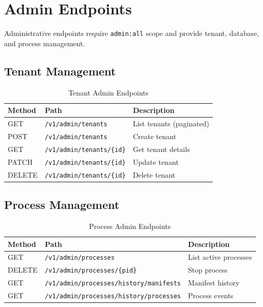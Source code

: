 \section{Admin Endpoints}
\label{app:api:admin}

Administrative endpoints require \texttt{admin:all} scope and provide tenant, database, and process management.

\subsection{Tenant Management}

\begin{table}[ht]
\centering
\caption{Tenant Admin Endpoints}
\label{tab:tenant-admin-endpoints}
\small
\begin{tabularx}{\textwidth}{llX}
    \hline
    \textbf{Method} & \textbf{Path} & \textbf{Description} \\
    \hline
    GET & \texttt{/v1/admin/tenants} & List tenants (paginated) \\
    POST & \texttt{/v1/admin/tenants} & Create tenant \\
    GET & \texttt{/v1/admin/tenants/\{id\}} & Get tenant details \\
    PATCH & \texttt{/v1/admin/tenants/\{id\}} & Update tenant \\
    DELETE & \texttt{/v1/admin/tenants/\{id\}} & Delete tenant \\
    \hline
\end{tabularx}
\end{table}

\subsection{Process Management}

\begin{table}[ht]
\centering
\caption{Process Admin Endpoints}
\label{tab:process-admin-endpoints}
\small
\begin{tabularx}{\textwidth}{llX}
    \hline
    \textbf{Method} & \textbf{Path} & \textbf{Description} \\
    \hline
    GET & \texttt{/v1/admin/processes} & List active processes \\
    DELETE & \texttt{/v1/admin/processes/\{pid\}} & Stop process \\
    GET & \texttt{/v1/admin/processes/history/manifests} & Manifest history \\
    GET & \texttt{/v1/admin/processes/history/processes} & Process events \\
    \hline
\end{tabularx}
\end{table}

